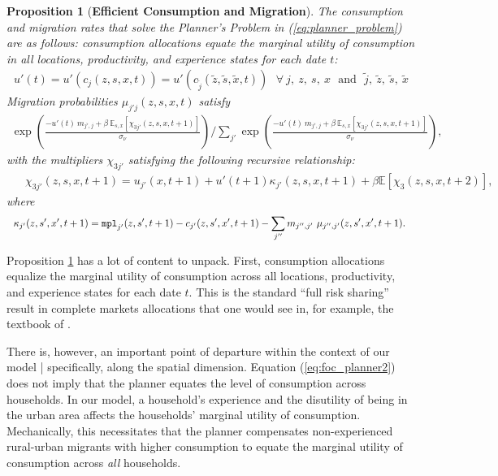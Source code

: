 \documentclass[12pt,pdftex]{article}
\newtheorem{proposition}{Proposition}
\begin{document}
\begin{proposition}[\textbf{Efficient Consumption and Migration}] \label{prp:efficient} The consumption and migration rates that solve the Planner's Problem in (\ref{eq:planner_problem}) are as follows: consumption allocations equate the marginal utility of consumption in all locations, productivity, and experience states for each date $t$:
{\small
\begin{align}
u'(t) = u'(c_{j}(z, s, x, t)) = u'(c_{\tilde{j}}(\tilde{z}, \tilde{s}, \tilde{x}, t)) \ \ \ \forall \ j, \ z , \ s, \ x \ \ \ \mbox{and} \ \ \ \tilde{j}, \ \tilde{z}, \ \tilde{s}, \ \tilde{x}
\label{eq:foc_planner2}
\end{align}
}
Migration probabilities  $\mu_{j'j}(z,s,x,t)$ satisfy
{\footnotesize
\begin{align}
\exp \left(\frac{- u'(t) \ m_{j',j} + \beta \ \mathbb{E}_{s,x}\left[\chi_{3j'}(z,s,x, t+1)\right]}{\sigma_{\nu}} \right)  \Bigg / \sum_{j'} \exp \left( \frac{- u'(t)\ m_{j',j} + \beta \  \mathbb{E}_{s,x}\left[\chi_{3j'}(z,s,x, t+1) \right]}{\sigma_{\nu}} \right), \label{eq:migration_prob}
\end{align}
}
with the multipliers $\chi_{3j'}$ satisfying the following recursive relationship:
{\small
\begin{align}
& \ \ \chi_{3j'}(z, s, x, t+1) =  u_{j'}(x, t+1) +  u'(t+1) \kappa_{j'}(z, s,x,t+1) + \beta \mathbb{E}\left[\chi_{3}(z,s,x, t+2) \right], \label{eq:dynamic_multiplier}
\end{align}}
where
{\small
\begin{align}
& \ \ \kappa_{j'}(z, s',x',t+1) = \mbox{\texttt{mpl}}_{j'}(z,s',t+1) - c_{j'}(z, s',x',t+1) - \sum_{j''}  m_{j'',j'} \ \mu_{j'',j'}(z, s', x', t+1). \label{eq:kappa}
\end{align}}
\end{proposition}
Proposition \ref{prp:efficient} has a lot of content to unpack. First, consumption allocations equalize the marginal utility of consumption across all locations, productivity, and experience states for each date $t$. This is the standard ``full risk sharing'' result in complete markets allocations that one would see in, for example, the textbook of \citet{ljsa03}.

There is, however, an important point of departure within the context of our model | specifically, along the spatial dimension. Equation (\ref{eq:foc_planner2}) does not imply that the planner equates the level of consumption across households. In our model, a household's experience and the disutility of being in the urban area affects the households' marginal utility of consumption. Mechanically, this necessitates that the planner compensates non-experienced rural-urban migrants with higher consumption to equate the marginal utility of consumption across \emph{all} households.
\end{document}
